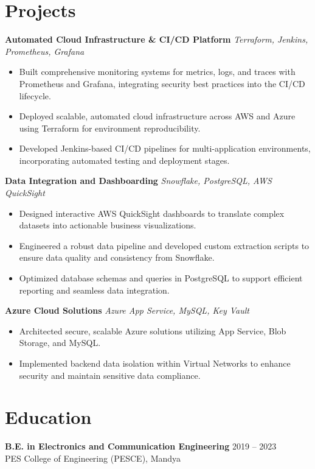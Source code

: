 \documentclass[a4paper,11pt]{article}
\begin{document}
\section*{Projects}

\textbf{Automated Cloud Infrastructure \& CI/CD Platform} \hfill \textit{Terraform, Jenkins, Prometheus, Grafana}
\begin{itemize}[nosep, leftmargin=0.2in]
    \item Built comprehensive monitoring systems for metrics, logs, and traces with Prometheus and Grafana, integrating security best practices into the CI/CD lifecycle.
    \item Deployed scalable, automated cloud infrastructure across AWS and Azure using Terraform for environment reproducibility.
    \item Developed Jenkins-based CI/CD pipelines for multi-application environments, incorporating automated testing and deployment stages.
\end{itemize}

\vspace{5pt}

\textbf{Data Integration and Dashboarding} \hfill \textit{Snowflake, PostgreSQL, AWS QuickSight}
\begin{itemize}[nosep, leftmargin=0.2in]
    \item Designed interactive AWS QuickSight dashboards to translate complex datasets into actionable business visualizations.
    \item Engineered a robust data pipeline and developed custom extraction scripts to ensure data quality and consistency from Snowflake.
    \item Optimized database schemas and queries in PostgreSQL to support efficient reporting and seamless data integration.
\end{itemize}

\vspace{5pt}

\textbf{Azure Cloud Solutions} \hfill \textit{Azure App Service, MySQL, Key Vault}
\begin{itemize}[nosep, leftmargin=0.2in]
    \item Architected secure, scalable Azure solutions utilizing App Service, Blob Storage, and MySQL.
    \item Implemented backend data isolation within Virtual Networks to enhance security and maintain sensitive data compliance.
\end{itemize}

\section*{Education}
\textbf{B.E. in Electronics and Communication Engineering} \hfill 2019 – 2023 \\
PES College of Engineering (PESCE), Mandya
\end{document}
